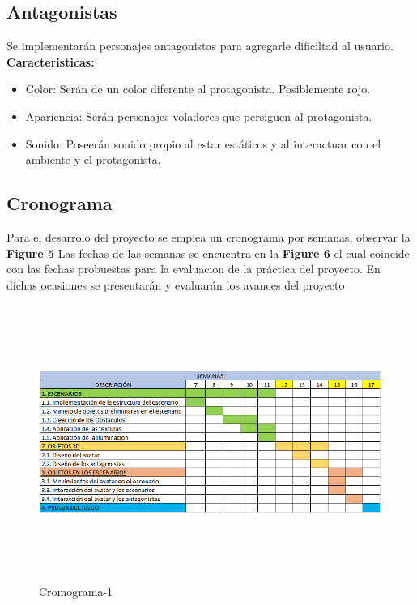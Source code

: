 \documentclass[a4paper]{article}
\begin{document}
\subsection{Antagonistas}
Se implementarán personajes antagonistas para agregarle dificiltad al usuario.\\

\textbf{Caracteristicas:}

\begin{itemize}
	\item Color: Serán de un color diferente al protagonista. Posiblemente rojo.
	\item Apariencia: Serán personajes voladores que persiguen al protagonista.
	\item Sonido: Poseerán sonido propio al estar estáticos y al interactuar con el ambiente y el protagonista.
	
\end{itemize}

\subsection{Cronograma}
Para el desarrolo del proyecto se emplea un cronograma por semanas, observar la \textbf{Figure 5}
Las fechas de las semanas se encuentra en la \textbf{Figure 6} el cual coincide con las fechas probuestas para la evaluacion de la práctica del proyecto. En dichas ocasiones se presentarán y evaluarán los avances del proyecto


\begin{figure}
	\centering
	\includegraphics[width=15.0cm,height=9.0cm]{Cronograma_1.PNG}
	\caption{Cromograma-1}
	\label{FI1_5}
\end{figure}
\end{document}
